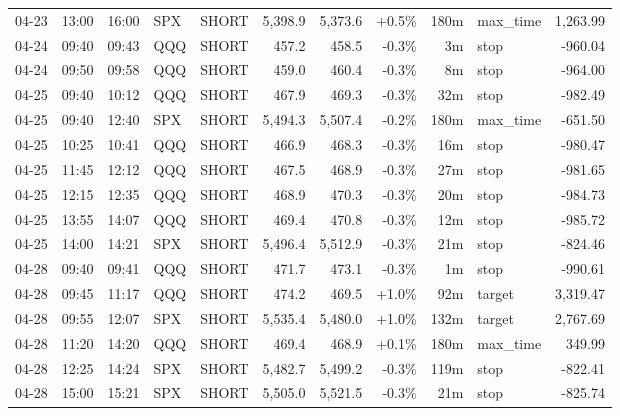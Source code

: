 \documentclass[11pt,a4paper,twoside]{article}
\begin{document}
\begin{center}
\begin{longtable}{>{\color{txtmain}}l l l l l r r r r >{\color{txtmain}}l r}
04-23 & 13:00 & 16:00 & SPX & SHORT & 5,398.9 & 5,373.6 & \textcolor{wingreen}{+0.5\%} & 180m & max\_time & \textcolor{wingreen}{1,263.99} \\
04-24 & 09:40 & 09:43 & QQQ & SHORT & 457.2 & 458.5 & \textcolor{lossred}{-0.3\%} & 3m & stop & \textcolor{lossred}{-960.04} \\
04-24 & 09:50 & 09:58 & QQQ & SHORT & 459.0 & 460.4 & \textcolor{lossred}{-0.3\%} & 8m & stop & \textcolor{lossred}{-964.00} \\
04-25 & 09:40 & 10:12 & QQQ & SHORT & 467.9 & 469.3 & \textcolor{lossred}{-0.3\%} & 32m & stop & \textcolor{lossred}{-982.49} \\
04-25 & 09:40 & 12:40 & SPX & SHORT & 5,494.3 & 5,507.4 & \textcolor{lossred}{-0.2\%} & 180m & max\_time & \textcolor{lossred}{-651.50} \\
04-25 & 10:25 & 10:41 & QQQ & SHORT & 466.9 & 468.3 & \textcolor{lossred}{-0.3\%} & 16m & stop & \textcolor{lossred}{-980.47} \\
04-25 & 11:45 & 12:12 & QQQ & SHORT & 467.5 & 468.9 & \textcolor{lossred}{-0.3\%} & 27m & stop & \textcolor{lossred}{-981.65} \\
04-25 & 12:15 & 12:35 & QQQ & SHORT & 468.9 & 470.3 & \textcolor{lossred}{-0.3\%} & 20m & stop & \textcolor{lossred}{-984.73} \\
04-25 & 13:55 & 14:07 & QQQ & SHORT & 469.4 & 470.8 & \textcolor{lossred}{-0.3\%} & 12m & stop & \textcolor{lossred}{-985.72} \\
04-25 & 14:00 & 14:21 & SPX & SHORT & 5,496.4 & 5,512.9 & \textcolor{lossred}{-0.3\%} & 21m & stop & \textcolor{lossred}{-824.46} \\
04-28 & 09:40 & 09:41 & QQQ & SHORT & 471.7 & 473.1 & \textcolor{lossred}{-0.3\%} & 1m & stop & \textcolor{lossred}{-990.61} \\
04-28 & 09:45 & 11:17 & QQQ & SHORT & 474.2 & 469.5 & \textcolor{wingreen}{+1.0\%} & 92m & target & \textcolor{wingreen}{3,319.47} \\
04-28 & 09:55 & 12:07 & SPX & SHORT & 5,535.4 & 5,480.0 & \textcolor{wingreen}{+1.0\%} & 132m & target & \textcolor{wingreen}{2,767.69} \\
04-28 & 11:20 & 14:20 & QQQ & SHORT & 469.4 & 468.9 & \textcolor{wingreen}{+0.1\%} & 180m & max\_time & \textcolor{wingreen}{349.99} \\
04-28 & 12:25 & 14:24 & SPX & SHORT & 5,482.7 & 5,499.2 & \textcolor{lossred}{-0.3\%} & 119m & stop & \textcolor{lossred}{-822.41} \\
04-28 & 15:00 & 15:21 & SPX & SHORT & 5,505.0 & 5,521.5 & \textcolor{lossred}{-0.3\%} & 21m & stop & \textcolor{lossred}{-825.74} \\

\end{longtable}
\end{center}
\end{document}
